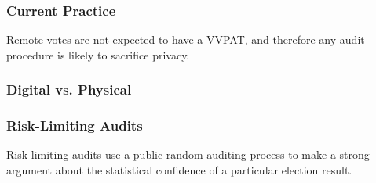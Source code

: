 \subsubsection{Current Practice}
Remote votes are not expected to have a VVPAT, and therefore any audit
procedure is likely to sacrifice privacy. 

\subsubsection{Digital vs. Physical}


\subsubsection{Risk-Limiting Audits}
Risk limiting audits use a public random auditing process to make a strong
argument about the statistical confidence of a particular election result. 
